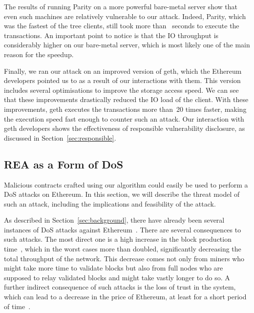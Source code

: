 The results of running Parity on a more powerful bare-metal server show that even such machines are relatively vulnerable to our attack. Indeed, Parity, which was the fastest of the tree clients, still took more than~ seconds to execute the transactions. An important point to notice is that the IO throughput is considerably higher on our bare-metal server, which is most likely one of the main reason for the speedup.

Finally, we ran our attack on an improved version of geth, which the Ethereum developers pointed us to as a result of our interactions with them. This version includes several optimisations to improve the storage access speed. We can see that these improvements drastically reduced the IO load of the client. With these improvements, geth executes the transactions more than~20 times faster, making the execution speed fast enough to counter such an attack. Our interaction with geth developers shows the effectiveness of responsible vulnerability disclosure, as discussed in Section~\ref{sec:responsible}. 

\subsection{REA as a Form of DoS}


Malicious contracts crafted using our algorithm could easily be used to perform a DoS attacks on Ethereum. In this section, we will describe the threat model of such an attack, including the implications and feasibility of the attack.

As described in Section~\ref{sec:background}, there have already been several instances of DoS attacks against Ethereum~\cite{transaction-spam-attack,suicide-attack}. There are several consequences to such attacks. The most direct one is a high increase in the block production time~\cite{average-block-time}, which in the worst cases more than doubled, significantly decreasing the total throughput of the network. This decrease comes not only from miners who might take more time to validate blocks but also from full nodes who are supposed to relay validated blocks and might take vastly longer to do so. A further indirect consequence of such attacks is the loss of trust in the system, which can lead to a decrease in the price of Ethereum, at least for a short period of time~\cite{Chen2017Metering}.

